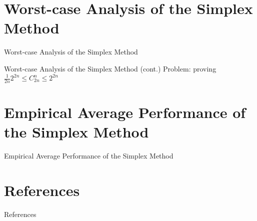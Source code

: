 \documentclass[10pt]{beamer}
\begin{document}
\section{Worst-case Analysis of the Simplex Method}
\begin{frame}{Worst-case Analysis of the Simplex Method}

\end{frame}

\begin{frame}{Worst-case Analysis of the Simplex Method (cont.)}
Problem: proving $\displaystyle \frac{1}{2n}2^{2n} \leq C_{2n}^n \leq 2^{2n} $\cite{Vanderbei2020}
\end{frame}

\section{Empirical Average Performance of the Simplex Method}
\begin{frame}{Empirical Average Performance of the Simplex Method}

\end{frame}

\section{References}
\begin{frame}[allowframebreaks]{References}
\printbibliography
\end{frame}
\end{document}
